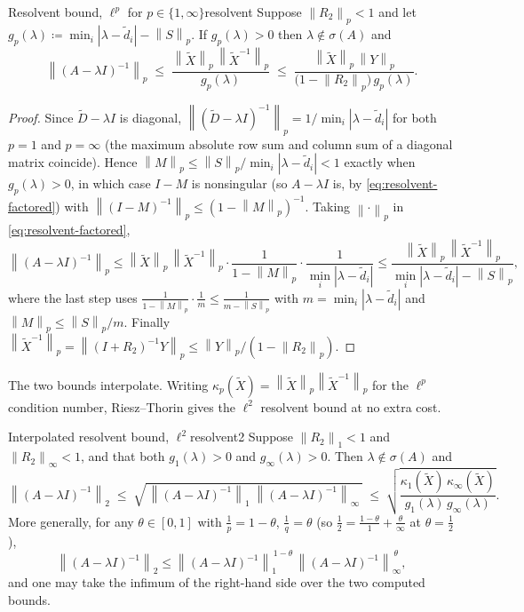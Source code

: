 \documentclass[11pt, a4paper]{article}
\numberwithin{equation}{section}
\newcommand{\norm}[1]{\left\|#1\right\|}
\newcommand{\abs}[1]{\left|#1\right|}
\newcommand{\tX}{\widetilde{X}}
\newcommand{\tD}{\widetilde{D}}
\begin{document}
\begin{theorem}{Resolvent bound, $\ell^p$ for $p \in \{1,\infty\}$}{resolvent}
  Suppose $\norm{R_2}_p < 1$ and let $g_p(\lambda) \coloneqq \min_i \abs{\lambda
  - \tilde d_i} - \norm{S}_p$.  If $g_p(\lambda) > 0$ then $\lambda \notin
  \sigma(A)$ and
  \[
    \norm{(A - \lambda I)^{-1}}_p
      \;\le\; \frac{\norm{\tX}_p\,\norm{\tX^{-1}}_p}{g_p(\lambda)}
      \;\le\; \frac{\norm{\tX}_p\,\norm{Y}_p}
                   {\bigl(1 - \norm{R_2}_p\bigr)\,g_p(\lambda)}.
  \]
\end{theorem}

\begin{proof}
Since $\tD - \lambda I$ is diagonal, $\norm{(\tD - \lambda I)^{-1}}_p =
1/\min_i\abs{\lambda - \tilde d_i}$ for both $p = 1$ and $p = \infty$ (the
maximum absolute row sum and column sum of a diagonal matrix coincide).  Hence
$\norm{M}_p \le \norm{S}_p / \min_i\abs{\lambda - \tilde d_i} < 1$ exactly when
$g_p(\lambda) > 0$, in which case $I - M$ is nonsingular (so $A - \lambda I$ is,
by \eqref{eq:resolvent-factored}) with $\norm{(I-M)^{-1}}_p \le (1 -
\norm{M}_p)^{-1}$.  Taking $\norm{\cdot}_p$ in \eqref{eq:resolvent-factored},
\[
  \norm{(A - \lambda I)^{-1}}_p
    \le \norm{\tX}_p\,\norm{\tX^{-1}}_p \cdot
        \frac{1}{1 - \norm{M}_p}\cdot\frac{1}{\min_i\abs{\lambda - \tilde d_i}}
    \le \frac{\norm{\tX}_p\,\norm{\tX^{-1}}_p}
             {\min_i\abs{\lambda - \tilde d_i} - \norm{S}_p},
\]
where the last step uses $\frac{1}{1-\norm{M}_p}\cdot\frac{1}{m} \le
\frac{1}{m - \norm{S}_p}$ with $m = \min_i\abs{\lambda - \tilde d_i}$ and
$\norm{M}_p \le \norm{S}_p/m$.  Finally $\norm{\tX^{-1}}_p =
\norm{(I+R_2)^{-1}Y}_p \le \norm{Y}_p/(1 - \norm{R_2}_p)$.
\end{proof}

The two bounds interpolate.  Writing $\kappa_p(\tX) = \norm{\tX}_p
\norm{\tX^{-1}}_p$ for the $\ell^p$ condition number, Riesz--Thorin gives the
$\ell^2$ resolvent bound at no extra cost.

\begin{theorem}{Interpolated resolvent bound, $\ell^2$}{resolvent2}
  Suppose $\norm{R_2}_1 < 1$ and $\norm{R_2}_\infty < 1$, and that both
  $g_1(\lambda) > 0$ and $g_\infty(\lambda) > 0$.  Then $\lambda \notin
  \sigma(A)$ and
  \[
    \norm{(A - \lambda I)^{-1}}_2
      \;\le\; \sqrt{\,\norm{(A - \lambda I)^{-1}}_1\;
                     \norm{(A - \lambda I)^{-1}}_\infty\,}
      \;\le\; \sqrt{\frac{\kappa_1(\tX)\,\kappa_\infty(\tX)}
                         {g_1(\lambda)\,g_\infty(\lambda)}}.
  \]
  More generally, for any $\theta \in [0,1]$ with $\tfrac1{p} = 1-\theta$,
  $\tfrac1{q} = \theta$ \textup{(}so $\tfrac12 = \tfrac{1-\theta}{1} +
  \tfrac{\theta}{\infty}$ at $\theta = \tfrac12$\textup{)},
  \[
    \norm{(A - \lambda I)^{-1}}_2
      \le \norm{(A - \lambda I)^{-1}}_1^{\,1-\theta}\,
          \norm{(A - \lambda I)^{-1}}_\infty^{\,\theta},
  \]
  and one may take the infimum of the right-hand side over the two computed
  bounds.
\end{theorem}
\end{document}
